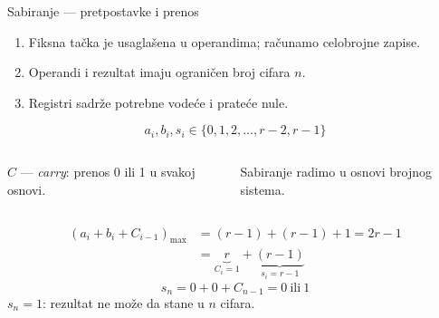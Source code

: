 \begin{frame}[label=05-s013]{Sabiranje — pretpostavke i prenos}
\fontsize{10}{12}\selectfont\setlength{\abovedisplayskip}{3pt}\setlength{\belowdisplayskip}{3pt}\setlength{\parskip}{1pt}
\begin{enumerate}
\item Fiksna tačka je usaglašena u operandima; računamo celobrojne zapise.
\item Operandi i rezultat imaju ograničen broj cifara $n$.
\item Registri sadrže potrebne vodeće i prateće nule.
\end{enumerate}
\[a_i,b_i,s_i\in\{0,1,2,\ldots,r-2,r-1\}\]
\begin{columns}[c,onlytextwidth]
\centering
{}
$C$ — \textit{carry}: prenos 0 ili 1 u svakoj osnovi.\par
Sabiranje radimo u osnovi brojnog sistema.
\end{columns}
\[\begin{aligned}(a_i+b_i+C_{i-1})_{\max}&=(r-1)+(r-1)+1=2r-1\\&=\underbrace{r}_{C_i=1}+\underbrace{(r-1)}_{s_i=r-1}\end{aligned}\]
\[s_n=0+0+C_{n-1}=0\ \text{ili}\ 1\]
\alert{$s_n=1$: rezultat ne može da stane u $n$ cifara.}
\end{frame}
